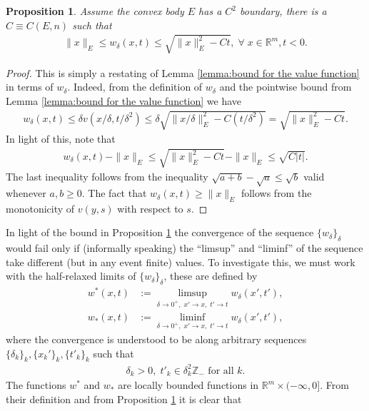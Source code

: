 \documentclass[reqno]{amsart}
\newtheorem{proposition}[theorem]{Proposition}
\numberwithin{equation}{section}
\begin{document}
\begin{proposition}\label{p:pointwise bound for w_delta}
  Assume the convex body $E$ has a $C^2$ boundary, there is a $C\equiv C(E,n)$ such that 
  \begin{align*}
    \|x\|_E \leq w_\delta(x,t) \leq \sqrt{\|x\|_E^2-Ct},\;\forall\;x\in\mathbb{R}^m,t<0.
  \end{align*}  
\end{proposition}

\begin{proof}
This is simply a restating of Lemma \ref{lemma:bound for the value function} in terms of $w_\delta$. Indeed, from the definition of $w_\delta$ and the pointwise bound from Lemma \ref{lemma:bound for the value function} we have
\begin{align*}
  w_\delta(x,t) \leq \delta v(x/\delta,t/\delta^2) \leq \delta \sqrt{ \|x/\delta\|_E^2-C(t/\delta^2)} = \sqrt{\|x\|_E^2-Ct}.
\end{align*}
In light of this, note that
\begin{align*}
  w_\delta(x,t) -\|x\|_E \leq \sqrt{\|x\|_E^2-Ct}-\|x\|_E \leq \sqrt{C|t|}.    
\end{align*}
The last inequality follows from the inequality $\sqrt{a+b}-\sqrt{a}\leq \sqrt{b}$ valid whenever $a,b\geq 0$. The fact that $w_\delta(x,t)\geq \|x\|_E$ follows from the monotonicity of $v(y,s)$ with respect to $s$.

\end{proof}
In light of the bound in Proposition \ref{p:pointwise bound for w_delta} the convergence of the sequence $\{w_\delta\}_\delta$ would fail only if (informally speaking) the ``limsup'' and ``liminf'' of the sequence take different (but in any event finite) values. To investigate this, we must work with the half-relaxed limits of $\{w_\delta\}_\delta$, these are defined by
\begin{align*}
  w^*(x,t) & := \limsup_{\delta \to 0^+,\;x'\to x,\;t'\to t}w_\delta(x',t'),\\
  w_*(x,t) & := \liminf_{\delta \to 0^+,\;x'\to x,\;t'\to t}w_\delta(x',t'),
\end{align*}
where the convergence is understood to be along arbitrary sequences $\{\delta_k\}_k,\{x_k'\}_k,\{t'_k\}_k$ such that 
\begin{align*}
  \delta_k>0,\; t'_k \in \delta_k^2 \mathbb{Z}_- \text{ for all } k.
\end{align*}
The functions $w^*$ and $w_*$ are locally bounded functions in $\mathbb{R}^m\times (-\infty,0]$. From their definition and from Proposition \ref{p:pointwise bound for w_delta} it is clear that 
\end{document}
